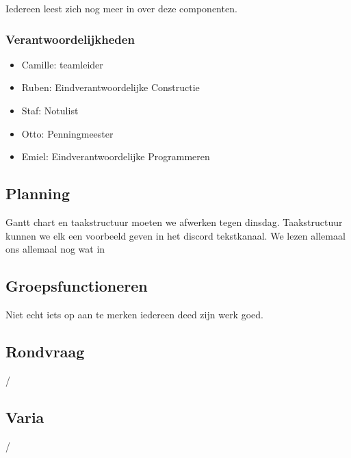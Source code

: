\documentclass[a4paper,kulak]{kulakarticle} %
\begin{document}
Iedereen leest zich nog meer in over deze componenten.

\subsubsection{Verantwoordelijkheden}
\begin{itemize}
	\item Camille: teamleider
	\item Ruben: Eindverantwoordelijke Constructie
	\item Staf: Notulist
	\item Otto: Penningmeester
	\item Emiel: Eindverantwoordelijke Programmeren
\end{itemize}


\subsection{Planning}
Gantt chart en taakstructuur moeten we afwerken tegen dinsdag. Taakstructuur kunnen we elk een voorbeeld geven in het discord tekstkanaal. We lezen allemaal ons allemaal nog wat in

\subsection{Groepsfunctioneren}
Niet echt iets op aan te merken iedereen deed zijn werk goed.

\subsection{Rondvraag}
/

\subsection{Varia}
/
\end{document}
